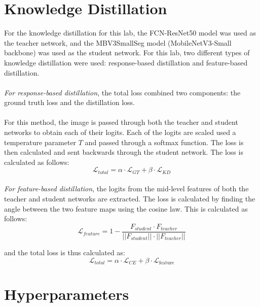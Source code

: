 \documentclass[letterpaper,11pt]{article}
\begin{document}
\section{Knowledge Distillation}
For the knowledge distillation for this lab, the FCN-ResNet50 model was used as the teacher network, and the MBV3SmallSeg model (MobileNetV3-Small backbone) was used as the student network. For this lab, two different types of knowledge distillation were used: response-based distillation and feature-based distillation. \\
\\
\textit{For response-based distillation}, the total loss combined two components: the ground truth loss and the distillation loss. \\
\\
For this method, the image is passed through both the teacher and student networks to obtain each of their logits. Each of the logits are scaled used a temperature parameter $T$ and passed through a softmax function. The loss is then calculated and sent backwards through the student network. The loss is calculated as follows: \\
\begin{equation}
  \mathcal{L}_{total} = \alpha \cdot \mathcal{L}_{GT} + \beta \cdot \mathcal{L}_{KD}
\end{equation}
\\
\textit{For feature-based distillation}, the logits from the mid-level features of both the teacher and student networks are extracted. The loss is calculated by finding the angle between the two feature maps using the cosine law. This is calculated as follows:
\begin{equation}
  \mathcal{L}_{feature} = 1 - \frac{F_{student} \cdot F_{teacher}}{||F_{student}|| \cdot ||F_{teacher}||}
\end{equation}

and the total loss is thus calculated as:
\begin{equation}
  \mathcal{L}_{total} = \alpha \cdot \mathcal{L}_{CE} + \beta \cdot \mathcal{L}_{\text{feature}}
\end{equation}

\section{Hyperparameters}
\end{document}
